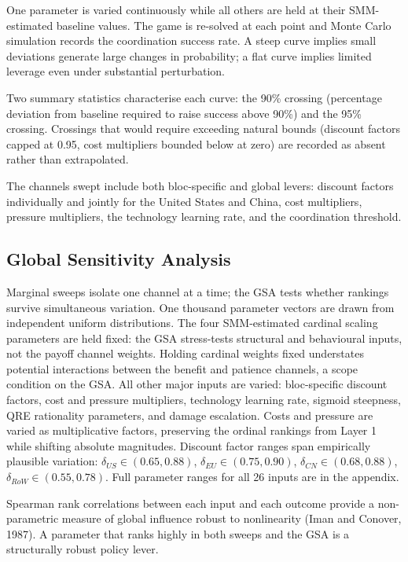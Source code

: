 \documentclass[10pt,a4paper]{article}
\begin{document}
One parameter is varied continuously while all others are held at their SMM-estimated baseline values. The game is re-solved at each point and Monte Carlo simulation records the coordination success rate. A steep curve implies small deviations generate large changes in probability; a flat curve implies limited leverage even under substantial perturbation.

Two summary statistics characterise each curve: the 90\% crossing (percentage deviation from baseline required to raise success above 90\%) and the 95\% crossing. Crossings that would require exceeding natural bounds (discount factors capped at 0.95, cost multipliers bounded below at zero) are recorded as absent rather than extrapolated.

The channels swept include both bloc-specific and global levers: discount factors individually and jointly for the United States and China, cost multipliers, pressure multipliers, the technology learning rate, and the coordination threshold.

\needspace{12em}
\subsection*{Global Sensitivity Analysis}

Marginal sweeps isolate one channel at a time; the GSA tests whether rankings survive simultaneous variation. One thousand parameter vectors are drawn from independent uniform distributions. The four SMM-estimated cardinal scaling parameters are held fixed: the GSA stress-tests structural and behavioural inputs, not the payoff channel weights. Holding cardinal weights fixed understates potential interactions between the benefit and patience channels, a scope condition on the GSA. All other major inputs are varied: bloc-specific discount factors, cost and pressure multipliers, technology learning rate, sigmoid steepness, QRE rationality parameters, and damage escalation. Costs and pressure are varied as multiplicative factors, preserving the ordinal rankings from Layer 1 while shifting absolute magnitudes. Discount factor ranges span empirically plausible variation: $\delta_{US} \in (0.65, 0.88)$, $\delta_{EU} \in (0.75, 0.90)$, $\delta_{CN} \in (0.68, 0.88)$, $\delta_{RoW} \in (0.55, 0.78)$. Full parameter ranges for all 26 inputs are in the appendix.

Spearman rank correlations between each input and each outcome provide a non-parametric measure of global influence robust to nonlinearity (Iman and Conover, 1987). A parameter that ranks highly in both sweeps and the GSA is a structurally robust policy lever.
\end{document}
